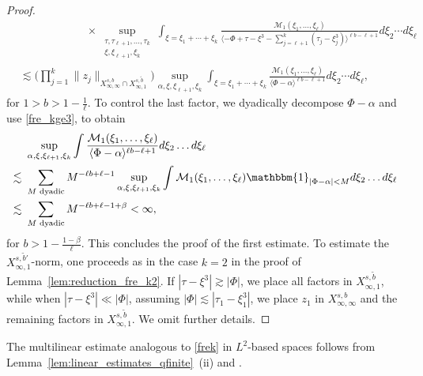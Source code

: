 \documentclass[a4paper,
11pt,  reqno]{amsart}
\newcommand{\fia}{\mathbbm{1}_{|\Phi-\alpha|<M}}
\newcommand{\jap}[1]{\langle #1 \rangle}
\newcommand{\5}{\textup{V}}
\newcommand{\les}{\lesssim}
\newcommand{\wt}{\widetilde}
\theoremstyle{remark}
\newcommand{\be}{\beta}
\renewcommand{\l}{\ell}
\newcommand{\ges}{\gtrsim}
\numberwithin{equation}{section}
\numberwithin{theorem}{section}
\begin{document}
\begin{proof}
\begin{align*}
                & \qquad \qquad \qquad \times 
                \sup_{\substack{\tau, \tau_{\ell+1},\dots,\tau_k\\ \xi, \xi_{\ell+1}, \xi_k}} \int_{\xi = \xi_1 + \cdots + \xi_k} \frac{ \mathcal{M}_1(\xi_1, \ldots, \xi_\l) 
                }{ \jap{- \Phi + \tau-\xi^3 - \sum_{j=\ell+1}^k (\tau_j-\xi_j^3)}^{\ell b - \ell +1}} d\xi_2\cdots d\xi_\ell  \\
                &
                \les 
                \bigg(\prod_{j=1}^k \|z_j\|_{X_{\infty,\infty}^{s,b} \cap X^{s, \wt b}_{\infty, 1}}
                \bigg) 
                \sup_{{\alpha,  \xi, \xi_{\ell+1}, \xi_k}} \int_{\xi = \xi_1 + \cdots + \xi_k}  \frac{\mathcal{M}_1(\xi_1, \ldots, \xi_\l)}{ \jap{\Phi -\alpha}^{\ell b - \ell +1}} d\xi_2\cdots d\xi_\ell
                , 
			\end{align*}
for $1>b> 1- \frac1\l$.
			To control the last factor, we dyadically decompose  $\Phi-\alpha$ and use \eqref{fre_kge3}, to obtain
			\begin{align*}
				&\sup_{{\alpha,  \xi, \xi_{\ell+1}, \xi_k}} \int  \frac{\mathcal{M}_1(\xi_1, \ldots, \xi_\l)}{ \jap{\Phi -\alpha}^{\ell b - \ell +1}} d\xi_2\dots d\xi_\ell \\\lesssim\ & \sum_{M \text{ dyadic}} M^{-\ell b +\ell-1} \sup_{{\alpha,  \xi, \xi_{\ell+1}, \xi_k}} \int \mathcal{M}_1(\xi_1, \ldots, \xi_\l) \fia d\xi_2\dots d\xi_\ell \\\lesssim\ & \sum_{M \text{ dyadic}} M^{-\ell b +\ell-1+\beta} <\infty, 
			\end{align*}
            for $b > 1 - \frac{1-\be}{\l}$. 
			This concludes the proof of the first estimate. To estimate the $X^{s, \wt b'}_{\infty,1}$-norm, one proceeds as in the case $k=2$ in the proof of Lemma~\ref{lem:reduction_fre_k2}. 
            {If $|\tau - \xi^3| \ges |\Phi|$, we place all factors in $X^{s, \wt b}_{\infty, 1}$, while when $|\tau-\xi^3| \ll |\Phi|$, assuming $|\Phi| \les |\tau_1-\xi_1^3|$, we place $z_1$ in $X^{s, b}_{\infty, \infty}$ and the remaining factors in $X^{s, \wt b}_{\infty, 1}$. We omit further details.}
\qedhere

            
		\end{proof}


        The multilinear estimate analogous to \eqref{frek} in $L^2$-based spaces follows from
        Lemma~\ref{lem:linear_estimates_qfinite}~(ii) and \cite[Lemma 2]{COS}.

        
		
\end{document}
